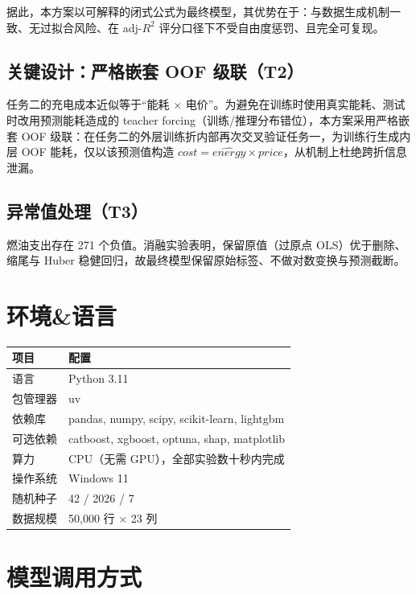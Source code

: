 \documentclass[12pt,a4paper]{ctexart}
\begin{document}
据此，本方案以可解释的闭式公式为最终模型，其优势在于：与数据生成机制一致、无过拟合风险、在 adj-$R^2$ 评分口径下不受自由度惩罚、且完全可复现。

\subsection{关键设计：严格嵌套 OOF 级联（T2）}

任务二的充电成本近似等于``能耗 $\times$ 电价''。为避免在训练时使用真实能耗、测试时改用预测能耗造成的 teacher forcing（训练/推理分布错位），本方案采用严格嵌套 OOF 级联：在任务二的外层训练折内部再次交叉验证任务一，为训练行生成内层 OOF 能耗，仅以该预测值构造 $cost = \hat{energy} \times price$，从机制上杜绝跨折信息泄漏。

\subsection{异常值处理（T3）}

燃油支出存在 271 个负值。消融实验表明，保留原值（过原点 OLS）优于删除、缩尾与 Huber 稳健回归，故最终模型保留原始标签、不做对数变换与预测截断。

\section{环境\&语言}

\begin{table}[h]
\centering
\begin{tabular}{ll}
\toprule
\textbf{项目} & \textbf{配置} \\
\midrule
语言 & Python 3.11 \\
包管理器 & uv \\
依赖库 & pandas, numpy, scipy, scikit-learn, lightgbm \\
可选依赖 & catboost, xgboost, optuna, shap, matplotlib \\
算力 & CPU（无需 GPU），全部实验数十秒内完成 \\
操作系统 & Windows 11 \\
随机种子 & 42 / 2026 / 7 \\
数据规模 & 50,000 行 $\times$ 23 列 \\
\bottomrule
\end{tabular}
\end{table}

\section{模型调用方式}
\end{document}
